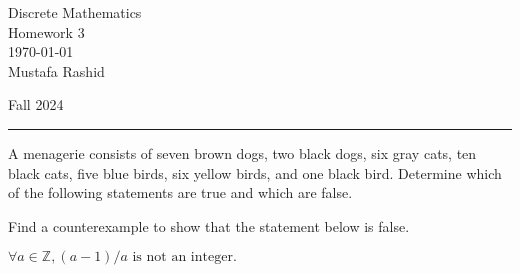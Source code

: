 \documentclass[12pt,letterpaper, onecolumn]{exam}
\begin{document}
	
	\begingroup  
	\centering
	\LARGE Discrete Mathematics\\
	\LARGE Homework 3\\[0.5em]
	\large \today\\[0.5em]
	\large Mustafa Rashid\par
	\large Fall 2024\par
	\endgroup
	\rule{\textwidth}{0.4pt}
	\pointsdroppedatright
	\printanswers
	\renewcommand{\solutiontitle}{\noindent\textbf{Ans:}\enspace}  
	\begin{questions}
	
	\question  A menagerie consists of seven brown dogs, two black dogs, six gray cats, ten black cats, five blue birds, six yellow birds, and one black bird. Determine which of the following statements are true and which are false.
	\begin{solution}
	\end{solution}
	\question Find a counterexample to show that the statement below is false.\\
		\begin{center}
			$\forall a \in \mathbb{Z}, (a-1)/a \textrm{ is not an integer.}$
		\end{center} 


\end{questions}
\end{document}
